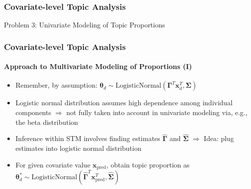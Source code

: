 \documentclass[xcolor=dvipsnames]{beamer}
\begin{document}
\begin{frame}
\frametitle{Covariate-level Topic Analysis}
\begin{center}
Problem 3: Univariate Modeling of Topic Proportions
\end{center}
\end{frame}

\begin{frame}
\frametitle{Covariate-level Topic Analysis}
\framesubtitle{Approach to Multivariate Modeling of Proportions (I)}
\begin{itemize}
\item Remember, by assumption: $\boldsymbol{\theta}_d \sim \text{LogisticNormal}(\boldsymbol{\Gamma}^T\boldsymbol{x}_d^T, \boldsymbol{\Sigma})$
\item Logistic normal distribution assumes high dependence among individual components $\Rightarrow$ not fully taken into account in univariate modeling via, e.g., the beta distribution
\item Inference within STM involves finding estimates $\hat{\boldsymbol{\Gamma}}$ and $\hat{\boldsymbol{\Sigma}}$ $\Rightarrow$ Idea: plug estimates into logistic normal distribution
\item For given covariate value $\boldsymbol{x}_{\text{pred}}$, obtain topic proportion as $\boldsymbol{\theta}^*_d \sim \text{LogisticNormal}(\hat{\boldsymbol{\Gamma}}^T\boldsymbol{x}_{\text{pred}}^T, \hat{\boldsymbol{\Sigma}})$
\end{itemize}
\end{frame}
\end{document}
